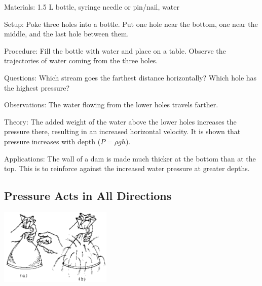 \begin{multicols}{2}
\begin{description*}
\item[Materials:]{1.5 L bottle, syringe needle or pin/nail, water}
\item[Setup:]{Poke three holes into a bottle. Put one hole near the bottom, one near the middle, and the last hole between them.}
\item[Procedure:]{Fill the bottle with water and place on a table. Observe the trajectories of water coming from the three holes.}
\item[Questions:]{Which stream goes the farthest distance horizontally? Which hole has the highest pressure?}
\item[Observations:]{The water flowing from the lower holes travels farther.}
\item[Theory:]{The added weight of the water above the lower holes increases the pressure there, resulting in an increased horizontal velocity. It is shown that pressure increases with depth ($P = \rho g h$).}
\item[Applications:]{The wall of a dam is made much thicker at the bottom than at the top. This is to reinforce against the increased water pressure at greater depths.}
\end{description*}

\subsection{Pressure Acts in All Directions}

\begin{center}
\includegraphics[width=0.4\textwidth]{./img/source/pressure-direction.png}
\end{center}


\end{multicols}
